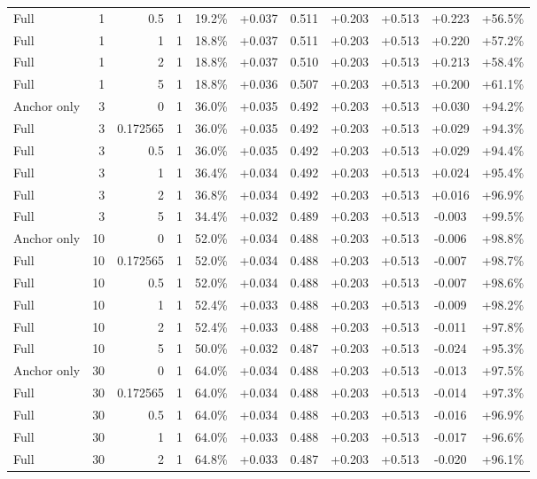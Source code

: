 \begin{table}[htbp]
\begin{tabular}{lrrrccccccc}
Full & 1 & 0.5 & 1 & 19.2\% & +0.037 & 0.511 & +0.203 & +0.513 & +0.223 & +56.5\% \\
Full & 1 & 1 & 1 & 18.8\% & +0.037 & 0.511 & +0.203 & +0.513 & +0.220 & +57.2\% \\
Full & 1 & 2 & 1 & 18.8\% & +0.037 & 0.510 & +0.203 & +0.513 & +0.213 & +58.4\% \\
Full & 1 & 5 & 1 & 18.8\% & +0.036 & 0.507 & +0.203 & +0.513 & +0.200 & +61.1\% \\
Anchor only & 3 & 0 & 1 & 36.0\% & +0.035 & 0.492 & +0.203 & +0.513 & +0.030 & +94.2\% \\
Full & 3 & 0.172565 & 1 & 36.0\% & +0.035 & 0.492 & +0.203 & +0.513 & +0.029 & +94.3\% \\
Full & 3 & 0.5 & 1 & 36.0\% & +0.035 & 0.492 & +0.203 & +0.513 & +0.029 & +94.4\% \\
Full & 3 & 1 & 1 & 36.4\% & +0.034 & 0.492 & +0.203 & +0.513 & +0.024 & +95.4\% \\
Full & 3 & 2 & 1 & 36.8\% & +0.034 & 0.492 & +0.203 & +0.513 & +0.016 & +96.9\% \\
Full & 3 & 5 & 1 & 34.4\% & +0.032 & 0.489 & +0.203 & +0.513 & -0.003 & +99.5\% \\
Anchor only & 10 & 0 & 1 & 52.0\% & +0.034 & 0.488 & +0.203 & +0.513 & -0.006 & +98.8\% \\
Full & 10 & 0.172565 & 1 & 52.0\% & +0.034 & 0.488 & +0.203 & +0.513 & -0.007 & +98.7\% \\
Full & 10 & 0.5 & 1 & 52.0\% & +0.034 & 0.488 & +0.203 & +0.513 & -0.007 & +98.6\% \\
Full & 10 & 1 & 1 & 52.4\% & +0.033 & 0.488 & +0.203 & +0.513 & -0.009 & +98.2\% \\
Full & 10 & 2 & 1 & 52.4\% & +0.033 & 0.488 & +0.203 & +0.513 & -0.011 & +97.8\% \\
Full & 10 & 5 & 1 & 50.0\% & +0.032 & 0.487 & +0.203 & +0.513 & -0.024 & +95.3\% \\
Anchor only & 30 & 0 & 1 & 64.0\% & +0.034 & 0.488 & +0.203 & +0.513 & -0.013 & +97.5\% \\
Full & 30 & 0.172565 & 1 & 64.0\% & +0.034 & 0.488 & +0.203 & +0.513 & -0.014 & +97.3\% \\
Full & 30 & 0.5 & 1 & 64.0\% & +0.034 & 0.488 & +0.203 & +0.513 & -0.016 & +96.9\% \\
Full & 30 & 1 & 1 & 64.0\% & +0.033 & 0.488 & +0.203 & +0.513 & -0.017 & +96.6\% \\
Full & 30 & 2 & 1 & 64.8\% & +0.033 & 0.487 & +0.203 & +0.513 & -0.020 & +96.1\% \\

\end{tabular}
\end{table}
